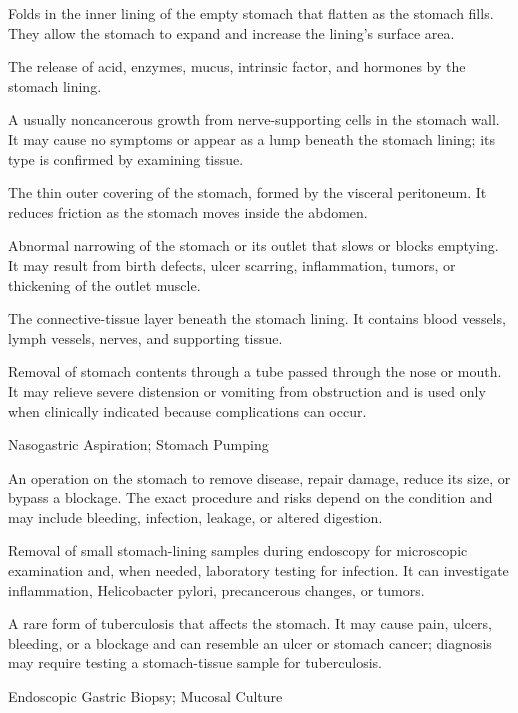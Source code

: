  Folds in the inner lining of the empty stomach that flatten as the stomach fills. They allow the stomach to expand and increase the lining's surface area.

 The release of acid, enzymes, mucus, intrinsic factor, and hormones by the stomach lining.

 A usually noncancerous growth from nerve-supporting cells in the stomach wall. It may cause no symptoms or appear as a lump beneath the stomach lining; its type is confirmed by examining tissue.

 The thin outer covering of the stomach, formed by the visceral peritoneum. It reduces friction as the stomach moves inside the abdomen.

 Abnormal narrowing of the stomach or its outlet that slows or blocks emptying. It may result from birth defects, ulcer scarring, inflammation, tumors, or thickening of the outlet muscle.

 The connective-tissue layer beneath the stomach lining. It contains blood vessels, lymph vessels, nerves, and supporting tissue.

 Removal of stomach contents through a tube passed through the nose or mouth. It may relieve severe distension or vomiting from obstruction and is used only when clinically indicated because complications can occur.

\synonyms
Nasogastric Aspiration; Stomach Pumping

 An operation on the stomach to remove disease, repair damage, reduce its size, or bypass a blockage. The exact procedure and risks depend on the condition and may include bleeding, infection, leakage, or altered digestion.

 Removal of small stomach-lining samples during endoscopy for microscopic examination and, when needed, laboratory testing for infection. It can investigate inflammation, Helicobacter pylori, precancerous changes, or tumors.

 A rare form of tuberculosis that affects the stomach. It may cause pain, ulcers, bleeding, or a blockage and can resemble an ulcer or stomach cancer; diagnosis may require testing a stomach-tissue sample for tuberculosis.

\synonyms
Endoscopic Gastric Biopsy; Mucosal Culture

